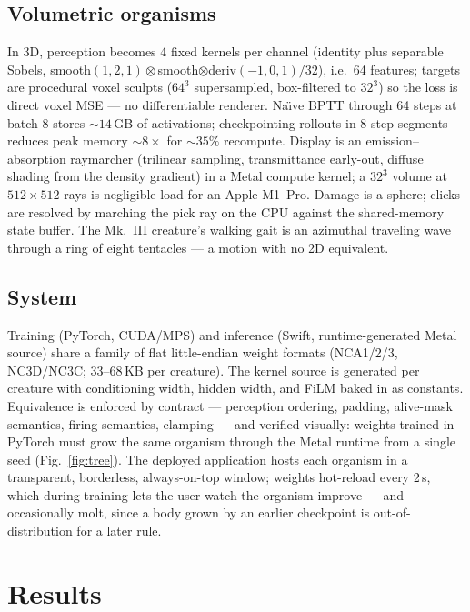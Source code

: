 \documentclass[11pt]{article}
\begin{document}
\subsection{Volumetric organisms}
In 3D, perception becomes 4 fixed kernels per channel (identity plus separable
Sobels, smooth$(1,2,1)\otimes$smooth$\otimes$deriv$(-1,0,1)/32$), i.e.\ 64
features; targets are procedural voxel sculpts ($64^3$ supersampled, box-filtered
to $32^3$) so the loss is direct voxel MSE --- no differentiable renderer.
Na\"{\i}ve BPTT through 64 steps at batch 8 stores ${\sim}14$\,GB of
activations; checkpointing rollouts in 8-step segments reduces peak memory
${\sim}8\times$ for ${\sim}35\%$ recompute. Display is an emission--absorption
raymarcher (trilinear sampling, transmittance early-out, diffuse shading from
the density gradient) in a Metal compute kernel; a $32^3$ volume at
$512\times512$ rays is negligible load for an Apple M1~Pro. Damage is a
sphere; clicks are resolved by marching the pick ray on the CPU against the
shared-memory state buffer. The Mk.~III creature's walking gait is an
azimuthal traveling wave through a ring of eight tentacles --- a motion with
no 2D equivalent.

\subsection{System}
Training (PyTorch, CUDA/MPS) and inference (Swift, runtime-generated Metal
source) share a family of flat little-endian weight formats (NCA1/2/3,
NC3D/NC3C; 33--68\,KB per creature). The kernel source is generated per
creature with conditioning width, hidden width, and FiLM baked in as
constants. Equivalence is enforced by contract --- perception ordering,
padding, alive-mask semantics, firing semantics, clamping --- and verified
visually: weights trained in PyTorch must grow the same organism through the
Metal runtime from a single seed (Fig.~\ref{fig:tree}). The deployed
application hosts each organism in a transparent, borderless, always-on-top
window; weights hot-reload every 2\,s, which during training lets the user
watch the organism improve --- and occasionally molt, since a body grown by
an earlier checkpoint is out-of-distribution for a later rule.

\section{Results}
\end{document}
